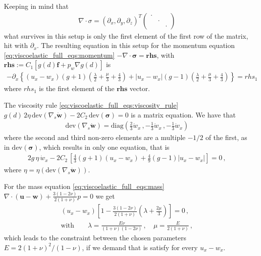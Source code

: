 \documentclass[11pt,a4paper]{article}
\newcommand{\p}{\partial}
\newcommand{\bb}[1]{\boldsymbol{#1}}
\newcommand{\dev}{\text{dev}}
\begin{document}
Keeping in mind that
\begin{align*}
    \nabla \cdot \sigma = (\p_x, \p_y, \p_z)^T 
    \begin{pmatrix}
    \cdot &  &  \\
     & \cdot &  \\
     &  & \cdot
    \end{pmatrix}
\end{align*}
what survives in this setup is only the first element of the first row of the matrix, hit with $\p_x$. The resulting equation in this setup for the momentum equation \eqref{eq:viscoelastic_full_eqs:momentum} $- \nabla \cdot \bb{\sigma} = \bb{rhs}$, with $\bb{rhs} := C_1 \left[g(d) \bb{f} + p_w \nabla g(d) \right]$ is
\begin{align*}
    - \p_x \left\{ 
        (u_x-w_x)(g+1)
        \left(\frac{\lambda}{2} + \frac{\mu}{3} + \frac{4}{3} \right)
        +
        |u_x-w_x|(g-1)
        \left(\frac{\lambda}{2} + \frac{\mu}{3} + \frac{4}{3} \right)
        \right\}
    = rhs_1
\end{align*} 
where $rhs_1$ is the first element of the $\bb{rhs}$ vector.

The viscosity rule \eqref{eq:viscoelastic_full_eqs:viscosity_rule} $g(d) \, 2 \eta \, \dev(\nabla_s \bb{\dot{w}}) - 2 C_2 \, \dev(\bb{\sigma}) = 0$ is a matrix equation. We have that 
\begin{align*}
    \dev (\nabla_s \dot{\bb{w}}) = 
    \text{diag}
    \left(
        \frac{2}{3}\dot{w}_x \,, 
        -\frac{1}{3}\dot{w}_x \,,
        -\frac{1}{3}\dot{w}_x
    \right) 
\end{align*}
where the second and third non-zero elements are a multiple $-1/2$ of the first, as in $\dev(\bb{\sigma})$, which results in only one equation, that is
\begin{align*}
    2 g \, \eta \, \dot{w}_x 
    - 
    2 C_2 \, 
    \left[ \frac{4}{3} (g+1) (u_x-w_x)
    + \frac{4}{9} (g-1) |u_x-w_x|
    \right] 
    =0 
    \,,
\end{align*}
where $\eta = \eta(\dev(\nabla_s \dot{\bb{w}}))$.

For the mass equation \eqref{eq:viscoelastic_full_eqs:mass} $\nabla \cdot \left(\bb{u}-\bb{w}\right) + \frac{3 \left(1-2\nu\right)}{2 \left(1 + \nu\right)} p = 0$ we get
\begin{align*}
    (u_x - w_x) 
    \left[
        1 - \frac{3 \left(1-2\nu\right)}{2 \left(1 + \nu\right)}
        (\lambda + \frac{2\mu}{3})
    \right]
    = 0\,,
    \\
    \text{with}
    \qquad
    \lambda = \frac{E \nu}{(1+\nu)(1-2\nu)}
    \,, \quad
    \mu = \frac{E}{2(1+\nu)}
    \,,
\end{align*}
which leads to the constraint between the chosen parameters $E = 2(1+\nu)^2/(1-\nu)$, if we demand that is satisfy for every $u_x-w_x$.
\end{document}
